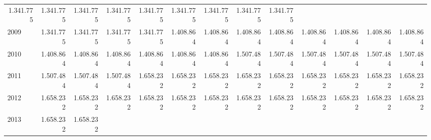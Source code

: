 \begin{tabular}{lllllllllllll}
  \multicolumn{1}{r}{1.341.775} &
  \multicolumn{1}{r}{1.341.775} &
  \multicolumn{1}{r}{1.341.775} &
  \multicolumn{1}{r}{1.341.775} &
  \multicolumn{1}{r}{1.341.775} &
  \multicolumn{1}{r}{1.341.775} &
  \multicolumn{1}{r}{1.341.775} &
  \multicolumn{1}{r}{1.341.775} &
  \multicolumn{1}{r}{1.341.775} \\
\multicolumn{1}{l}{\hspace{1em}2009} &
  \multicolumn{1}{|r}{1.341.775} &
  \multicolumn{1}{r}{1.341.775} &
  \multicolumn{1}{r}{1.341.775} &
  \multicolumn{1}{r}{1.341.775} &
  \multicolumn{1}{r}{1.408.864} &
  \multicolumn{1}{r}{1.408.864} &
  \multicolumn{1}{r}{1.408.864} &
  \multicolumn{1}{r}{1.408.864} &
  \multicolumn{1}{r}{1.408.864} &
  \multicolumn{1}{r}{1.408.864} &
  \multicolumn{1}{r}{1.408.864} &
  \multicolumn{1}{r}{1.408.864} \\
\multicolumn{1}{l}{\hspace{1em}2010} &
  \multicolumn{1}{|r}{1.408.864} &
  \multicolumn{1}{r}{1.408.864} &
  \multicolumn{1}{r}{1.408.864} &
  \multicolumn{1}{r}{1.408.864} &
  \multicolumn{1}{r}{1.408.864} &
  \multicolumn{1}{r}{1.408.864} &
  \multicolumn{1}{r}{1.507.484} &
  \multicolumn{1}{r}{1.507.484} &
  \multicolumn{1}{r}{1.507.484} &
  \multicolumn{1}{r}{1.507.484} &
  \multicolumn{1}{r}{1.507.484} &
  \multicolumn{1}{r}{1.507.484} \\
\multicolumn{1}{l}{\hspace{1em}2011} &
  \multicolumn{1}{|r}{1.507.484} &
  \multicolumn{1}{r}{1.507.484} &
  \multicolumn{1}{r}{1.507.484} &
  \multicolumn{1}{r}{1.658.232} &
  \multicolumn{1}{r}{1.658.232} &
  \multicolumn{1}{r}{1.658.232} &
  \multicolumn{1}{r}{1.658.232} &
  \multicolumn{1}{r}{1.658.232} &
  \multicolumn{1}{r}{1.658.232} &
  \multicolumn{1}{r}{1.658.232} &
  \multicolumn{1}{r}{1.658.232} &
  \multicolumn{1}{r}{1.658.232} \\
\multicolumn{1}{l}{\hspace{1em}2012} &
  \multicolumn{1}{|r}{1.658.232} &
  \multicolumn{1}{r}{1.658.232} &
  \multicolumn{1}{r}{1.658.232} &
  \multicolumn{1}{r}{1.658.232} &
  \multicolumn{1}{r}{1.658.232} &
  \multicolumn{1}{r}{1.658.232} &
  \multicolumn{1}{r}{1.658.232} &
  \multicolumn{1}{r}{1.658.232} &
  \multicolumn{1}{r}{1.658.232} &
  \multicolumn{1}{r}{1.658.232} &
  \multicolumn{1}{r}{1.658.232} &
  \multicolumn{1}{r}{1.658.232} \\
\multicolumn{1}{l}{\hspace{1em}2013} &
  \multicolumn{1}{|r}{1.658.232} &
  \multicolumn{1}{r}{1.658.232} &

\end{tabular}
